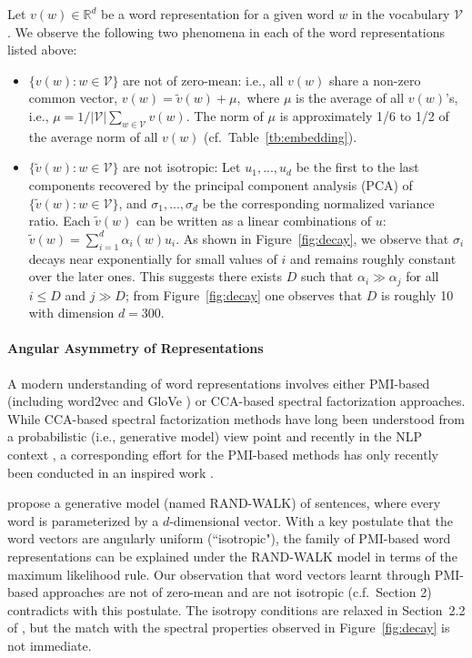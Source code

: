 \documentclass{article} \usepackage{acl2017,times}
\begin{document}
Let $v(w) \in \mathbb{R}^d $ be a word representation for a given word $w$ in the vocabulary $\mathcal{V}$. We observe the following two phenomena in each of the word representations listed above:
\begin{itemize}[leftmargin=*,,topsep=0pt]
\item $\{v(w): w\in \mathcal{\mathcal{V}}\}$ are not of zero-mean: i.e., all $v(w)$ share a non-zero common vector, 
$ v(w) = \tilde{v}(w) + \mu,$ 
where $\mu$ is the average of all $v(w)$'s, i.e., $\mu = {1}/{|\mathcal{V}|} \sum_{w\in \mathcal{V}} v(w)$. The norm of $\mu$ is approximately 1/6 to 1/2 of the  average norm of all $v(w)$ (cf.\ Table~\ref{tb:embedding}).
\item $\{\tilde{v}(w): w\in \mathcal{V}\}$ are not isotropic: Let $u_1,..., u_d$ be the first to the last components recovered by the principal component analysis (PCA) of $\{\tilde{v}(w): w\in \mathcal{V}\}$, and $\sigma_1,...,\sigma_d$ be the corresponding normalized variance ratio. Each $\tilde{v}(w)$ can be written as a linear combinations of $u$:
$ \tilde{v}(w) = \sum_{i=1}^d \alpha_i(w) u_i.$ 
As shown in Figure~\ref{fig:decay}, we observe that $\sigma_i$ decays near exponentially for  small values of $i$ and  remains roughly constant over the later ones. This suggests there exists $D$ such that $\alpha_i \gg \alpha_j$ for all $i \le D$ and $j \gg D$;  from Figure~\ref{fig:decay} one observes that $D$ is roughly  10 with  dimension $d=300$. 
\end{itemize} 

\paragraph{Angular Asymmetry of Representations} A modern understanding of word representations involves either PMI-based  (including word2vec \citep{mikolov2010recurrent,levy2014neural} and GloVe \citep{pennington2014glove}) or CCA-based  spectral factorization approaches. While CCA-based spectral factorization methods have long been understood from  a probabilistic (i.e., generative model) view point  \citep{browne1979maximum,hotelling1936relations} and   recently in the NLP context  \citep{stratos2015model},  a  corresponding  effort for the PMI-based methods has only recently been conducted in an inspired work   \citep{arora2015rand}. 

\citet{arora2015rand}  propose a generative model (named RAND-WALK) of sentences, where  every word is parameterized by a $d$-dimensional vector. With a key postulate that the word vectors are angularly uniform   (``isotropic"), the family of PMI-based word representations can be explained under the RAND-WALK model in terms of the maximum likelihood rule.  
Our observation that word vectors learnt through PMI-based approaches are not of zero-mean and are not isotropic (c.f.\ Section 2) contradicts with this postulate. The isotropy conditions  are  relaxed in Section~2.2  of \citep{arora2015rand}, but the match with the spectral properties observed in Figure~\ref{fig:decay} is not immediate.  
\end{document}
